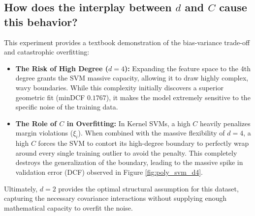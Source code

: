 \subsection*{How does the interplay between $d$ and $C$ cause this behavior?}

This experiment provides a textbook demonstration of the bias-variance trade-off and catastrophic overfitting:

\begin{itemize}
    \item \textbf{The Risk of High Degree ($d=4$):} Expanding the feature space to the 4th degree grants the SVM massive capacity, allowing it to draw highly complex, wavy boundaries. While this complexity initially discovers a superior geometric fit (minDCF $0.1767$), it makes the model extremely sensitive to the specific noise of the training data.
    \item \textbf{The Role of $C$ in Overfitting:} In Kernel SVMs, a high $C$ heavily penalizes margin violations ($\xi_i$). When combined with the massive flexibility of $d=4$, a high $C$ forces the SVM to contort its high-degree boundary to perfectly wrap around every single training outlier to avoid the penalty. This completely destroys the generalization of the boundary, leading to the massive spike in validation error (DCF) observed in Figure \ref{fig:poly_svm_d4}.
\end{itemize}

Ultimately, $d=2$ provides the optimal structural assumption for this dataset, capturing the necessary covariance interactions without supplying enough mathematical capacity to overfit the noise.